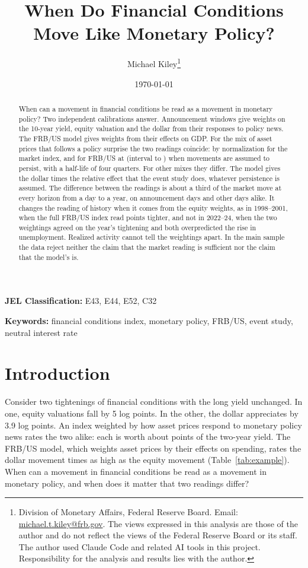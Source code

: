 \documentclass[11pt]{article}
\title{When Do Financial Conditions Move Like Monetary Policy?}
\author{Michael Kiley\thanks{Division of Monetary Affairs, Federal Reserve Board. Email: \href{mailto:michael.t.kiley@frb.gov}{michael.t.kiley@frb.gov}. The views expressed in this analysis are those of the author and do not reflect the views of the Federal Reserve Board or its staff. The author used Claude Code and related AI tools in this project. Responsibility for the analysis and results lies with the author.}}
\date{\today}
\begin{document}
\maketitle

\begin{abstract}
When can a movement in financial conditions be read as a movement in monetary policy? Two independent calibrations answer. Announcement windows give weights on the 10-year yield, equity valuation and the dollar from their responses to policy news. The FRB/US model gives weights from their effects on GDP. For the mix of asset prices that follows a policy surprise the two readings coincide: by normalization for the market index, and for FRB/US at  (interval  to ) when movements are assumed to persist,  with a half-life of four quarters. For other mixes they differ. The model gives the dollar  times the relative effect that the event study does, whatever persistence is assumed. The difference between the readings is about a third of the market move at every horizon from a day to a year, on announcement days and other days alike. It changes the reading of history when it comes from the equity weights, as in 1998--2001, when the full FRB/US index read  points tighter, and not in 2022--24, when the two weightings agreed on the year's tightening and both overpredicted the rise in unemployment. Realized activity cannot tell the weightings apart. In the main sample the data reject neither the claim that the market reading is sufficient nor the claim that the model's is.
\end{abstract}

\noindent\textbf{JEL Classification:} E43, E44, E52, C32

\noindent\textbf{Keywords:} financial conditions index, monetary policy, FRB/US, event study, neutral interest rate

\pagestyle{plain}

\newpage
{}

\section{Introduction}
\label{sec:intro}
Consider two tightenings of financial conditions with the long yield unchanged. In one, equity valuations fall by 5 log points. In the other, the dollar appreciates by 3.9 log points. An index weighted by how asset prices respond to monetary policy news rates the two alike: each is worth about  points of the two-year yield. The FRB/US model, which weights asset prices by their effects on spending, rates the dollar movement  times as high as the equity movement (Table~\ref{tab:example}). When can a movement in financial conditions be read as a movement in monetary policy, and when does it matter that two readings differ?
\end{document}
